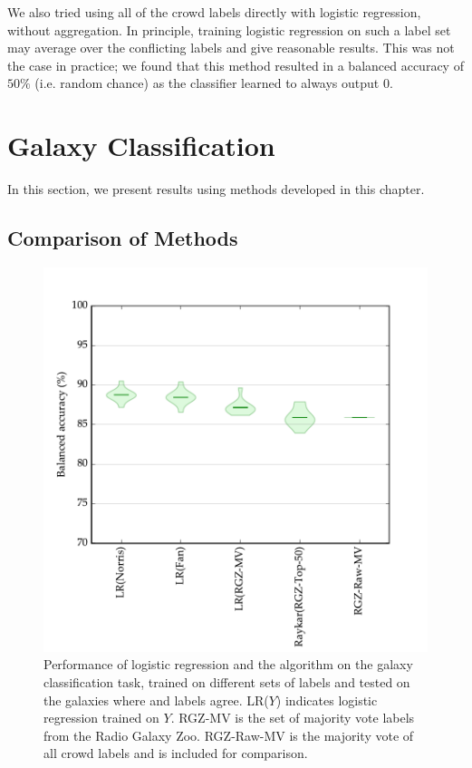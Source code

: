   We also tried using all of the crowd labels directly with logistic regression,
  without aggregation. In principle, training logistic regression on such a
  label set may average over the conflicting labels and give reasonable results.
  This was not the case in practice; we found that this method resulted in a
  balanced accuracy of $50\%$ (i.e. random chance) as the classifier learned to
  always output 0.

\section{Galaxy Classification}
\label{sec:rgz-results}

  In this section, we present results using methods developed in this chapter.

  \subsection{Comparison of Methods}
  \label{sec:comparison-predictors}

    \begin{figure}
      \centering
      \includegraphics[width=\textwidth]{images/experiments/predictors.pdf}
      \caption{Performance of logistic regression and the \citeauthor{raykar10}
        algorithm on the galaxy classification task, trained on different sets of
        labels and tested on the galaxies where \citeauthor{norris06} and
        \citeauthor{fan15} labels agree. LR($Y$) indicates logistic regression
        trained on $Y$. RGZ-MV is the set of majority vote labels from the Radio
        Galaxy Zoo. RGZ-Raw-MV is the majority vote of all crowd labels and is
        included for comparison.}
      \label{fig:predictors}
    \end{figure}

